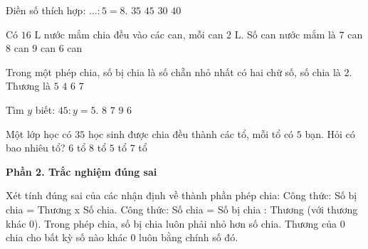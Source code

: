 \begin{ex} %
Điền số thích hợp: $\dots : 5 = 8$.
\choice
{$35$}
{$45$}
{$30$}
{\True $40$}
\end{ex}

\begin{ex} %
Có $16\text{ L}$ nước mắm chia đều vào các can, mỗi can $2\text{ L}$. Số can nước mắm là
\choice
{$7$ can}
{\True $8$ can}
{$9$ can}
{$6$ can}
\end{ex}

\begin{ex} %
Trong một phép chia, số bị chia là số chẵn nhỏ nhất có hai chữ số, số chia là $2$. Thương là
\choice
{\True $5$}
{$4$}
{$6$}
{$7$}
\end{ex}

\begin{ex} %
Tìm $y$ biết: $45 : y = 5$.
\choice
{$8$}
{$7$}
{\True $9$}
{$6$}
\end{ex}

\begin{ex} %
Một lớp học có $35$ học sinh được chia đều thành các tổ, mỗi tổ có $5$ bạn. Hỏi có bao nhiêu tổ?
\choice
{$6$ tổ}
{$8$ tổ}
{$5$ tổ}
{\True $7$ tổ}
\end{ex}

\textbf{Phần 2. Trắc nghiệm đúng sai}

\begin{ex} %
Xét tính đúng sai của các nhận định về thành phần phép chia:
\choiceTF
{\True Công thức: Số bị chia = Thương x Số chia.}
{\True Công thức: Số chia = Số bị chia : Thương (với thương khác 0).}
{Trong phép chia, số bị chia luôn phải nhỏ hơn số chia.}
{Thương của 0 chia cho bất kỳ số nào khác 0 luôn bằng chính số đó.}
\end{ex}

